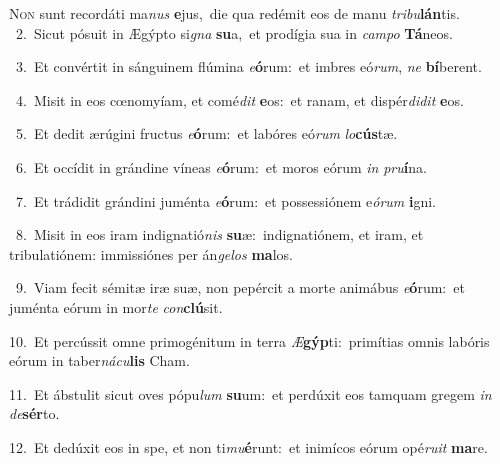 \lettrine{\initial\textcolor{\initialcolor}{N}}{on} sunt recordáti ma\textit{nus} \textbf{e}\-jus,~\star die qua redémit eos de manu \textit{tri}\-\textit{bu}\textbf{lán}tis.\\
{\numbfont\textcolor{\numbcolor}{~2.}}~Sicut pósuit in Ægýpto si\textit{gna} \textbf{su}\-a,~\star et prodígia sua in \textit{cam}\-\textit{po} \textbf{Tá}\-neos.\par
{\numbfont\textcolor{\numbcolor}{~3.}}~Et convértit in sánguinem flúmina \textit{e}\-\textbf{ó}rum:~\star et imbres eó\-\textit{rum}\-, \textit{ne} \textbf{bí}\-berent.\par
{\numbfont\textcolor{\numbcolor}{~4.}}~Misit in eos cœnomyíam, et comé\textit{dit} \textbf{e}\-os:~\star et ranam, et dispér\-\textit{di}\-\textit{dit} \textbf{e}\-os.\par
{\numbfont\textcolor{\numbcolor}{~5.}}~Et dedit ærúgini fructus \textit{e}\-\textbf{ó}rum:~\star et labóres eó\textit{rum} \textit{lo}\-\textbf{cús}tæ.\par
{\numbfont\textcolor{\numbcolor}{~6.}}~Et occídit in grándine víneas \textit{e}\-\textbf{ó}rum:~\star et moros eórum \textit{in} \textit{pru}\-\textbf{í}na.\par
{\numbfont\textcolor{\numbcolor}{~7.}}~Et trádidit grándini juménta \textit{e}\-\textbf{ó}rum:~\star et possessiónem e\-\textit{ó}\-\textit{rum} \textbf{i}\-gni.\par
{\numbfont\textcolor{\numbcolor}{~8.}}~Misit in eos iram indignatió\textit{nis} \textbf{su}\-æ:~\star indignatiónem, et iram, et tribulatiónem: immissiónes per án\-\textit{ge}\-\textit{los} \textbf{ma}\-los.\par
{\numbfont\textcolor{\numbcolor}{~9.}}~Viam fecit sémitæ iræ suæ, non pepércit a morte animábus \textit{e}\-\textbf{ó}rum:~\star et juménta eórum in mor\textit{te} \textit{con}\-\textbf{clú}sit.\par
{\numbfont\textcolor{\numbcolor}{10.}}~Et percússit omne primogénitum in terra \textit{Æ}\-\textbf{gýp}ti:~\star primítias omnis labóris eórum in taber\-\textit{ná}\-\textit{cu}\textbf{lis} Cham.\par
{\numbfont\textcolor{\numbcolor}{11.}}~Et ábstulit sicut oves pópu\textit{lum} \textbf{su}\-um:~\star et perdúxit eos tamquam gregem \textit{in} \textit{de}\-\textbf{sér}to.\par
{\numbfont\textcolor{\numbcolor}{12.}}~Et dedúxit eos in spe, et non ti\-\textit{mu}\-\textbf{é}runt:~\star et inimícos eórum opé\-\textit{ru}\-\textit{it} \textbf{ma}\-re.\par
